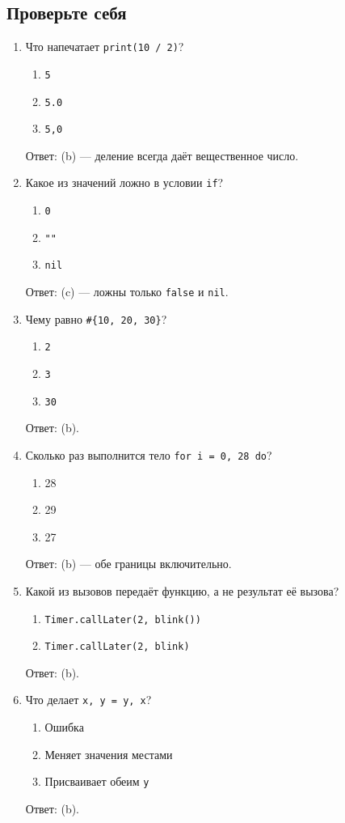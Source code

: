\subsection{Проверьте себя}
\begin{enumerate}
  \item Что напечатает \verb|print(10 / 2)|?
    \begin{enumerate}[label=(\alph*)] \item \verb|5| \item \verb|5.0| \item \verb|5,0| \end{enumerate}
    Ответ: (b) --- деление всегда даёт вещественное число.
  \item Какое из значений ложно в условии \verb|if|?
    \begin{enumerate}[label=(\alph*)] \item \verb|0| \item \verb|""| \item \verb|nil| \end{enumerate}
    Ответ: (c) --- ложны только \verb|false| и \verb|nil|.
  \item Чему равно \verb|#{10, 20, 30}|?
    \begin{enumerate}[label=(\alph*)] \item \verb|2| \item \verb|3| \item \verb|30| \end{enumerate}
    Ответ: (b).
  \item Сколько раз выполнится тело \verb|for i = 0, 28 do|?
    \begin{enumerate}[label=(\alph*)] \item 28 \item 29 \item 27 \end{enumerate}
    Ответ: (b) --- обе границы включительно.
  \item Какой из вызовов передаёт функцию, а не результат её вызова?
    \begin{enumerate}[label=(\alph*)] \item \verb|Timer.callLater(2, blink())| \item \verb|Timer.callLater(2, blink)| \end{enumerate}
    Ответ: (b).
  \item Что делает \verb|x, y = y, x|?
    \begin{enumerate}[label=(\alph*)] \item Ошибка \item Меняет значения местами \item Присваивает обеим \verb|y| \end{enumerate}
    Ответ: (b).
\end{enumerate}

